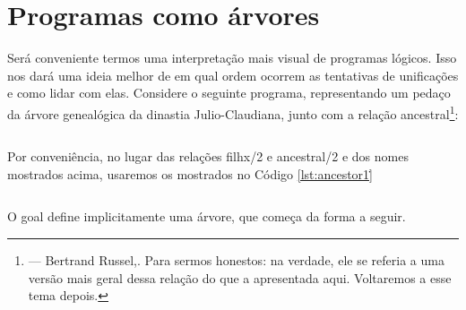 

%

\usetikzlibrary{arrows.meta,angles}


%
%
%


%

\section{Programas como árvores}

Será conveniente termos uma interpretação mais visual de programas lógicos. Isso nos dará uma ideia melhor de em qual ordem ocorrem as tentativas de unificações e como lidar com elas.
Considere o seguinte programa, representando um pedaço da árvore genealógica da dinastia Julio-Claudiana, junto com a relação ancestral\footnote{ --- Bertrand Russel,.
Para sermos honestos: na verdade, ele se referia a uma versão mais geral dessa relação do que a apresentada aqui. Voltaremos a esse tema depois.}:

    \begin{listing}[H]
\inputminted{prolog}{../Exemplos/Cap5/prog1_ancestor.pl}
\caption{Ancestral 0}
    \end{listing}

Por conveniência, no lugar das relações filhx/2 e ancestral/2 e dos nomes mostrados acima, usaremos
os mostrados no Código \ref{lst:ancestor1}\.

    \begin{listing}[H]
\inputminted{prolog}{../Exemplos/Cap5/prog2_ancestor.pl}
\caption{Ancestral 1}\label{lst:ancestor1}
    \end{listing}


O goal  define implicitamente uma árvore, que começa da forma a seguir.

